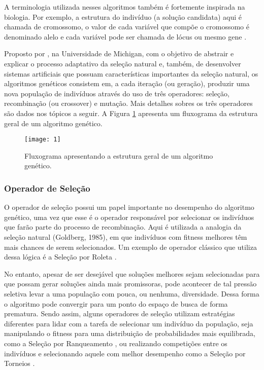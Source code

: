 A terminologia utilizada nesses algoritmos também é fortemente inspirada na biologia. Por exemplo, a estrutura do indivíduo (a solução candidata) aqui é chamada de cromossomo, o valor de cada variável que compõe o cromossomo é denominado alelo e cada variável pode ser chamada de lócus ou mesmo gene \cite{Back1997}.

Proposto por , na Universidade de Michigan, com o objetivo de abstrair e explicar o processo adaptativo da seleção natural e, também, de desenvolver sistemas artificiais que possuam características importantes da seleção natural, os algoritmos genéticos consistem em, a cada iteração (ou geração), produzir uma nova população de indivíduos através do uso de três operadores: seleção, recombinação (ou crossover) e mutação. Mais detalhes sobres os três operadores são dados nos tópicos a seguir. A Figura \ref{fig:fig2-1} apresenta um fluxograma da estrutura geral de um algoritmo genético. 

\begin{figure}[htb]
\centering
\texttt{[image: 1]}
\caption{Fluxograma apresentando a estrutura geral de um algoritmo genético.}
\label{fig:fig2-1}
\end{figure}

\subsubsection{Operador de Seleção}
O operador de seleção possui um papel importante no desempenho do algoritmo genético, uma vez que esse é o operador responsável por selecionar os indivíduos que farão parte do processo de recombinação.  Aqui é utilizada a analogia da seleção natural (Goldberg, 1985), em que indivíduos com fitness melhores têm mais chances de serem selecionados. Um exemplo de operador clássico que utiliza dessa lógica é a Seleção por Roleta \cite{Talbi2009, Kacprzyk2015, Luke2013Metaheuristics}.

No entanto, apesar de ser desejável que soluções melhores sejam selecionadas para que possam gerar soluções ainda mais promissoras, pode acontecer de tal pressão seletiva levar a uma população com pouca, ou nenhuma, diversidade. Dessa forma o algoritmo pode convergir para um ponto do espaço de busca de forma prematura. Sendo assim, alguns operadores de seleção utilizam estratégias diferentes para lidar com a tarefa de selecionar um indivíduo da população, seja manipulando o fitness para uma distribuição de probabilidades mais equilibrada, como a Seleção por Ranqueamento \cite{Talbi2009, Kacprzyk2015}, ou realizando competições entre os indivíduos e selecionando aquele com melhor desempenho como a Seleção por Torneios \cite{Talbi2009, Kacprzyk2015}. 

